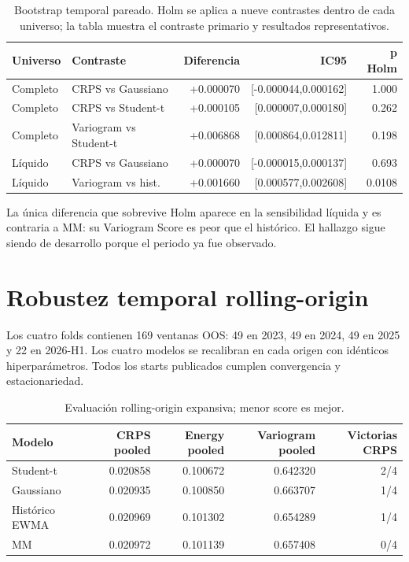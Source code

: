 \documentclass[11pt,letterpaper]{article}
\begin{document}
\begin{table}[ht]
\centering
\small
\begin{tabular}{llrrr}
\toprule
Universo & Contraste & Diferencia & IC95 & p Holm \\
\midrule
Completo & CRPS vs Gaussiano & +0.000070 & [-0.000044,0.000162] & 1.000 \\
Completo & CRPS vs Student-t & +0.000105 & [0.000007,0.000180] & 0.262 \\
Completo & Variogram vs Student-t & +0.006868 & [0.000864,0.012811] & 0.198 \\
Líquido & CRPS vs Gaussiano & +0.000070 & [-0.000015,0.000137] & 0.693 \\
Líquido & Variogram vs hist. & +0.001660 & [0.000577,0.002608] & 0.0108 \\
\bottomrule
\end{tabular}
\caption{Bootstrap temporal pareado. Holm se aplica a nueve contrastes dentro de
cada universo; la tabla muestra el contraste primario y resultados representativos.}
\end{table}

La única diferencia que sobrevive Holm aparece en la sensibilidad líquida y es
contraria a MM: su Variogram Score es peor que el histórico. El hallazgo sigue siendo
de desarrollo porque el periodo ya fue observado.

\section{Robustez temporal rolling-origin}

Los cuatro folds contienen 169 ventanas OOS: 49 en 2023, 49 en 2024, 49 en 2025 y
22 en 2026-H1. Los cuatro modelos se recalibran en cada origen con idénticos
hiperparámetros. Todos los starts publicados cumplen convergencia y estacionariedad.

\begin{table}[ht]
\centering
\small
\begin{tabular}{lrrrr}
\toprule
Modelo & CRPS pooled & Energy pooled & Variogram pooled & Victorias CRPS \\
\midrule
Student-t & 0.020858 & 0.100672 & 0.642320 & 2/4 \\
Gaussiano & 0.020935 & 0.100850 & 0.663707 & 1/4 \\
Histórico EWMA & 0.020969 & 0.101302 & 0.654289 & 1/4 \\
MM & 0.020972 & 0.101139 & 0.657408 & 0/4 \\
\bottomrule
\end{tabular}
\caption{Evaluación rolling-origin expansiva; menor score es mejor.}
\end{table}
\end{document}
